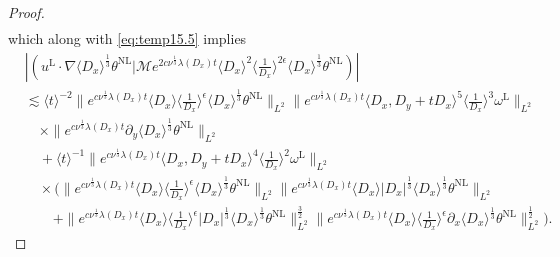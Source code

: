 \documentclass[reqno, 12pt]{amsart} %
\theoremstyle{plain} %
\theoremstyle{definition}
\theoremstyle{remark}
\numberwithin{equation}{section} %
\newcommand{\px}{\partial_x}
\newcommand{\py}{\partial_y}
\begin{document}
\begin{proof}
\begin{equation*}
\begin{aligned}
		\end{aligned}\end{equation*}
		which along with \eqref{eq:temp15.5} implies
		\begin{equation}\begin{aligned} \label{eq:sum3}
				&\left|\left(  u^{\mathrm{L}} \cdot\nabla \langle D_x \rangle^\frac13 \theta^{\mathrm{NL}} \big| \mathcal{M} e^{2 c \nu^{\frac{1}{3}} \lambda\left(D_x\right) t}\langle D_x\rangle^2\langle\frac{1}{D_x}\rangle^{2 \epsilon} \langle D_x \rangle^\frac13 \theta^{\mathrm{NL}}\right)\right| \\
				&\lesssim \langle t\rangle^{-2} \|e^{c \nu^{\frac{1}{3}} \lambda\left(D_x\right) t}\langle D_x\rangle  \langle \frac{1}{D_x}\rangle^\epsilon \langle D_x \rangle^\frac13  \theta^{\mathrm{NL}}\|_{L^2}    \|e^{c \nu^{\frac{1}{3}} \lambda\left(D_x\right) t}\langle D_x, D_y + tD_x\rangle^ 5 \langle\frac{1}{D_x}\rangle^3 \omega^{\mathrm{L}} \|_{L^2} \\
				&\quad \times \|e^{c \nu^{\frac{1}{3}} \lambda\left(D_x\right) t} \py \langle D_x \rangle^\frac13  \theta^{\mathrm{NL}} \|_{L^2} \\
				&\quad +  \langle t\rangle^{-1}     \|e^{c \nu^{\frac{1}{3}} \lambda\left(D_x\right) t}\langle D_x, D_y+t D_x\rangle^4\langle\frac{1}{D_x}\rangle^2 \omega^{\mathrm{L}}\|_{L^2} \\
				& \quad \times (\|e^{c \nu^{\frac{1}{3}} \lambda\left(D_x\right) t}\langle D_x\rangle\langle\frac{1}{D_x}\rangle^\epsilon \langle D_x \rangle^\frac13 \theta^{\mathrm{NL}}\|_{L^2}  \| e^{c \nu^{\frac{1}{3}} \lambda\left(D_x\right) t} \langle D_x \rangle
				\left|D_x\right|^{\frac{1}{3}}  \langle D_x \rangle ^\frac13 \theta^{\mathrm{NL}} \|_{L^2} \\
				&\qquad + \|e^{c \nu^{\frac{1}{3}} \lambda\left(D_x\right) t}\langle D_x\rangle\langle\frac{1}{D_x}\rangle^\epsilon\left|D_x\right|^{\frac{1}{3}}  \langle D_x \rangle^\frac13  \theta^{\mathrm{NL}}\|_{L^2}^{\frac{3}{2}}   \|e^{c \nu^{\frac{1}{3}} \lambda\left(D_x\right) t}\langle D_x\rangle\langle\frac{1}{D_x}\rangle^\epsilon \px \langle D_x \rangle^\frac13  \theta^{\mathrm{NL}}\|_{L^2}^{\frac{1}{2}}).
		\end{aligned}\end{equation}
		
		
		

\end{proof}
\end{document}
